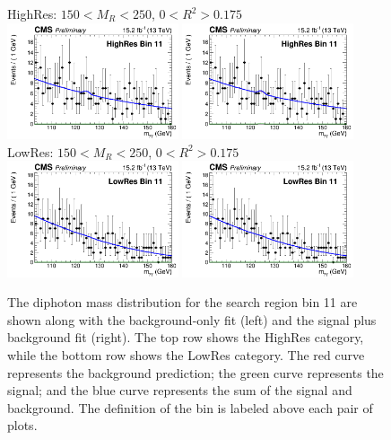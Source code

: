 \begin{figure}[ht!]
\centering
HighRes: $150 < M_{R} < 250$\GeV, $0 < R^{2}>0.175$\\
\includegraphics[width=0.45\textwidth, angle=0.]{figs/unblindedResults2p3Plus12p9/highResBin11_fit_b.png}
\includegraphics[width=0.45\textwidth, angle=0.]{figs/unblindedResults2p3Plus12p9/highResBin11_fit_s.png}\\
LowRes: $150 < M_{R} < 250$\GeV, $0 < R^{2}>0.175$\\
\includegraphics[width=0.45\textwidth, angle=0.]{figs/unblindedResults2p3Plus12p9/lowResBin11_fit_b.png}
\includegraphics[width=0.45\textwidth, angle=0.]{figs/unblindedResults2p3Plus12p9/lowResBin11_fit_s.png}\\
\caption{ The diphoton mass distribution for the search region bin 11 
are shown along with the background-only fit (left) and the signal plus background fit (right).
The top row shows the HighRes category, while the bottom row shows the LowRes category.
The red curve represents the background prediction; the green curve represents the signal; 
and the blue curve represents the sum of the signal and background. The definition of the bin
is labeled above each pair of plots.
\label{fig:UnblindedResultsBin11}}
\end{figure}

